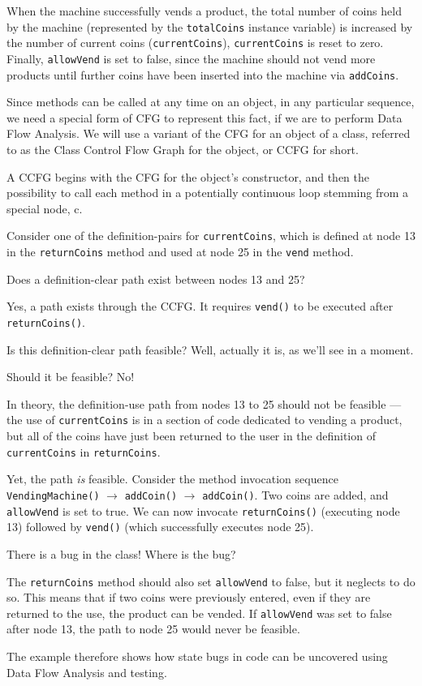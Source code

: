 When the machine successfully vends a product, the total number of coins held by
the machine (represented by the {\tt totalCoins} instance variable) is increased
by the number of current coins ({\tt currentCoins}), {\tt currentCoins} is reset
to zero. Finally, {\tt allowVend} is set to false, since the machine should not
vend more products until further coins have been inserted into the machine via
{\tt addCoins}.

Since methods can be called at any time on an object, in any particular
sequence, we need a special form of CFG to represent this fact, if we are to
perform Data Flow Analysis. We will use a variant of the CFG for an object of a
class, referred to as the Class Control Flow Graph for the object, or CCFG for
short. 


A CCFG begins with the CFG for the object's constructor, and then the
possibility to call each method in a potentially continuous loop stemming from a
special node, c.

Consider one of the definition-pairs for {\tt currentCoins}, which is defined at
node 13 in the {\tt returnCoins} method and used at node 25 in the {\tt vend}
method.

Does a definition-clear path exist between nodes 13 and 25?

Yes, a path exists through the CCFG. It requires {\tt vend()} to be executed
after {\tt returnCoins()}. 

Is this definition-clear path feasible? Well, actually it is, as we'll see in a
moment. 

Should it be feasible? No!

In theory, the definition-use path from nodes 13 to 25 should not be feasible
--- the use of {\tt currentCoins} is in a section of code dedicated to vending a
product, but all of the coins have just been returned to the user in the
definition of {\tt currentCoins} in {\tt returnCoins}.

Yet, the path {\it is} feasible. Consider the method invocation sequence {\tt
VendingMachine()} $\rightarrow$ {\tt addCoin()} $\rightarrow$ {\tt addCoin()}.
Two coins are added, and {\tt allowVend} is set to true. We can now invocate
{\tt returnCoins()} (executing node 13) followed by {\tt vend()} (which
successfully executes node 25). 

There is a bug in the class! Where is the bug?

The {\tt returnCoins} method should also set {\tt allowVend} to false, but it
neglects to do so. This means that if two coins were previously entered, even if
they are returned to the use, the product can be vended. If {\tt allowVend} was
set to false after node 13, the path to node 25 would never be feasible.

The example therefore shows how state bugs in code can be uncovered using Data
Flow Analysis and testing. 

